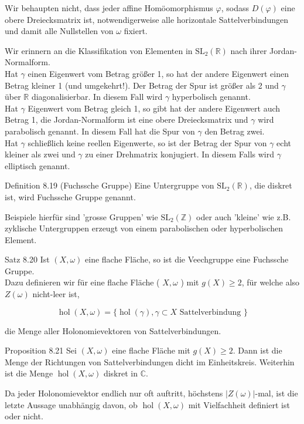 \documentclass[10pt, letterpaper]{article}
\begin{document}
Wir behaupten nicht, dass jeder affine Homöomorphismus $\varphi$, sodass $D(\varphi)$ eine obere Dreiecksmatrix ist, notwendigerweise alle horizontale Sattelverbindungen und damit alle Nullstellen von $\omega$ fixiert.

Wir erinnern an die Klassifikation von Elementen in $\mathrm{SL}_{2}(\mathbb{R})$ nach ihrer Jordan-Normalform.\\
Hat $\gamma$ einen Eigenwert vom Betrag größer 1, so hat der andere Eigenwert einen Betrag kleiner 1 (und umgekehrt!). Der Betrag der Spur ist größer als 2 und $\gamma$ über $\mathbb{R}$ diagonalisierbar. In diesem Fall wird $\gamma$ hyperbolisch genannt.\\
Hat $\gamma$ Eigenwert vom Betrag gleich 1, so gibt hat der andere Eigenwert auch Betrag 1, die Jordan-Normalform ist eine obere Dreiecksmatrix und $\gamma$ wird parabolisch genannt. In diesem Fall hat die Spur von $\gamma$ den Betrag zwei.\\
Hat $\gamma$ schließlich keine reellen Eigenwerte, so ist der Betrag der Spur von $\gamma$ echt kleiner als zwei und $\gamma$ zu einer Drehmatrix konjugiert. In diesem Falls wird $\gamma$ elliptisch genannt.

Definition 8.19 (Fuchssche Gruppe) Eine Untergruppe von $\mathrm{SL}_{2}(\mathbb{R})$, die diskret ist, wird Fuchssche Gruppe genannt.

Beispiele hierfür sind 'grosse Gruppen' wie $\mathrm{SL}_{2}(\mathbb{Z})$ oder auch 'kleine' wie z.B. zyklische Untergruppen erzeugt von einem parabolischen oder hyperbolischen Element.

Satz 8.20 Ist $(X, \omega)$ eine flache Fläche, so ist die Veechgruppe eine Fuchssche Gruppe.\\
Dazu definieren wir für eine flache Fläche ( $X, \omega$ ) mit $g(X) \geq 2$, für welche also $Z(\omega)$ nicht-leer ist,

$$
\operatorname{hol}(X, \omega)=\{\operatorname{hol}(\gamma), \gamma \subset X \text { Sattelverbindung }\}
$$

die Menge aller Holonomievektoren von Sattelverbindungen.

Proposition 8.21 Sei $(X, \omega)$ eine flache Fläche mit $g(X) \geq 2$. Dann ist die Menge der Richtungen von Sattelverbindungen dicht im Einheitskreis. Weiterhin ist die Menge $\operatorname{hol}(X, \omega)$ diskret in $\mathbb{C}$.

Da jeder Holonomievektor endlich nur oft auftritt, höchstens $|Z(\omega)|$-mal, ist die letzte Aussage unabhängig davon, ob $\operatorname{hol}(X, \omega)$ mit Vielfachheit definiert ist oder nicht.
\end{document}
